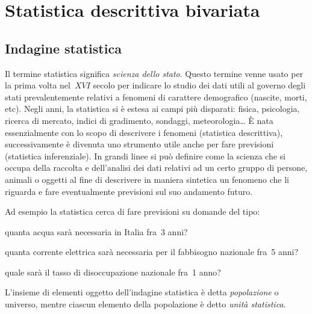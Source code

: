 


\chapter{Statistica descrittiva bivariata}

\section{Indagine statistica}
\label{sec:stat02_indagine}

Il termine statistica significa \emph{scienza dello stato}. Questo termine 
venne usato per la prima volta nel~\(XVI\) secolo
per indicare lo studio dei dati utili al governo degli stati 
prevalentemente relativi a fenomeni di carattere demografico (nascite, 
morti, etc).
Negli anni, la statistica si è estesa ai campi più disparati: fisica, 
psicologia, ricerca di mercato, indici di gradimento, sondaggi, 
meteorologia\ldots
È nata essenzialmente con lo scopo di descrivere i fenomeni (statistica 
descrittiva), successivamente è divenuta uno strumento utile
anche per fare previsioni (statistica inferenziale). In grandi linee si può 
definire come la scienza che si occupa della raccolta e dell'analisi dei 
dati relativi
ad un certo gruppo di persone, animali o oggetti al fine di descrivere in 
maniera sintetica un fenomeno che li riguarda e fare eventualmente 
previsioni sul suo andamento futuro.

Ad esempio la statistica cerca di fare previsioni su domande del tipo:
\begin{itemize*}
\item quanta acqua sarà necessaria in Italia fra~3 anni?
\item quanta corrente elettrica sarà necessaria per il fabbisogno nazionale 
fra~5 anni?
\item quale sarà il tasso di disoccupazione nazionale fra~1 anno?
\end{itemize*}

\begin{definizione}
L'insieme di elementi oggetto dell'indagine statistica è detta 
\emph{popolazione} o universo, mentre ciascun elemento della popolazione è 
detto \emph{unità statistica}.
\end{definizione}

